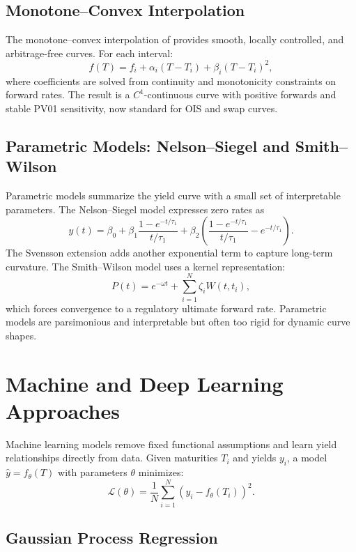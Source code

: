 \documentclass[12pt]{report}
\begin{document}
\subsection{Monotone–Convex Interpolation}

The monotone–convex interpolation of \textcite{HaganWest2006} provides smooth, locally controlled, and arbitrage-free curves.  
For each interval:
\[
f(T) = f_i + \alpha_i (T-T_i) + \beta_i (T-T_i)^2,
\]
where coefficients are solved from continuity and monotonicity constraints on forward rates.  
The result is a \(C^1\)-continuous curve with positive forwards and stable PV01 sensitivity, now standard for OIS and swap curves.

\subsection{Parametric Models: Nelson–Siegel and Smith–Wilson}

Parametric models summarize the yield curve with a small set of interpretable parameters.  
The Nelson–Siegel model \parencite{NelsonSiegel1987} expresses zero rates as
\[
y(t) = \beta_0 
      + \beta_1 \frac{1 - e^{-t/\tau_1}}{t/\tau_1}
      + \beta_2 \!\left(\frac{1 - e^{-t/\tau_1}}{t/\tau_1} - e^{-t/\tau_1}\right).
\]
The Svensson extension \parencite{Svensson1994} adds another exponential term to capture long-term curvature.  
The Smith–Wilson model \parencite{SmithWilson2001,EIOPA2018} uses a kernel representation:
\[
P(t) = e^{-\omega t} + \sum_{i=1}^N \zeta_i W(t,t_i),
\]
which forces convergence to a regulatory ultimate forward rate.  
Parametric models are parsimonious and interpretable but often too rigid for dynamic curve shapes.

\section{Machine and Deep Learning Approaches}

Machine learning models remove fixed functional assumptions and learn yield relationships directly from data.  
Given maturities \(T_i\) and yields \(y_i\), a model \( \hat{y} = f_\theta(T) \) with parameters \(\theta\) minimizes:
\[
\mathcal{L}(\theta)=\frac{1}{N}\sum_{i=1}^N (y_i-f_\theta(T_i))^2.
\]

\subsection{Gaussian Process Regression}
\end{document}
